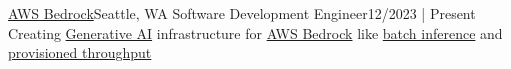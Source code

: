 \resumeSubheading
{\href{https://aws.amazon.com/bedrock/}{AWS Bedrock}}{Seattle, WA}
{Software Development Engineer}{12/2023 | Present}
\resumeItemListStart
{}
{Creating \href{https://en.wikipedia.org/wiki/Generative_artificial_intelligence}{Generative AI} infrastructure for \href{https://aws.amazon.com/bedrock/}{AWS Bedrock} like \href{https://docs.aws.amazon.com/bedrock/latest/userguide/batch-inference.html}{batch inference} and \href{https://docs.aws.amazon.com/bedrock/latest/userguide/prov-throughput.html}{provisioned throughput}}
\resumeItemListEnd
